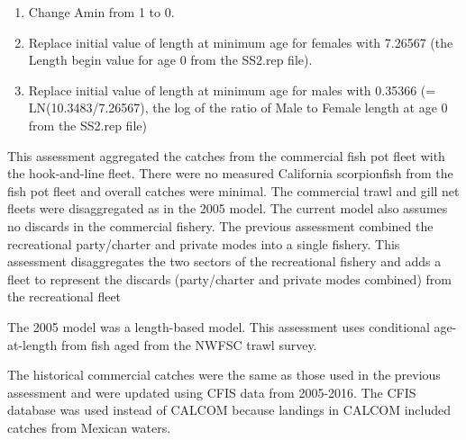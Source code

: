 \documentclass[12pt,]{article}
\begin{document}
\begin{enumerate}
 
 \item Change Amin from 1 to 0.
 
 \item Replace initial value of length at minimum age for females with 7.26567 (the Length begin value for age 
 0 from the SS2.rep file).
 
  \item Replace initial value of length at minimum age for males with 0.35366 (= LN(10.3483/7.26567), the 
  log of the ratio of Male to Female length at age 0 from the SS2.rep file)

\end{enumerate}

This assessment aggregated the catches from the commercial fish pot
fleet with the hook-and-line fleet. There were no measured California
scorpionfish from the fish pot fleet and overall catches were minimal.
The commercial trawl and gill net fleets were disaggregated as in the
2005 model. The current model also assumes no discards in the commercial
fishery. The previous assessment combined the recreational party/charter
and private modes into a single fishery. This assessment disaggregates
the two sectors of the recreational fishery and adds a fleet to
represent the discards (party/charter and private modes combined) from
the recreational fleet

The 2005 model was a length-based model. This assessment uses
conditional age-at-length from fish aged from the NWFSC trawl survey.

The historical commercial catches were the same as those used in the
previous assessment and were updated using CFIS data from 2005-2016. The
CFIS database was used instead of CALCOM because landings in CALCOM
included catches from Mexican waters.
\end{document}
